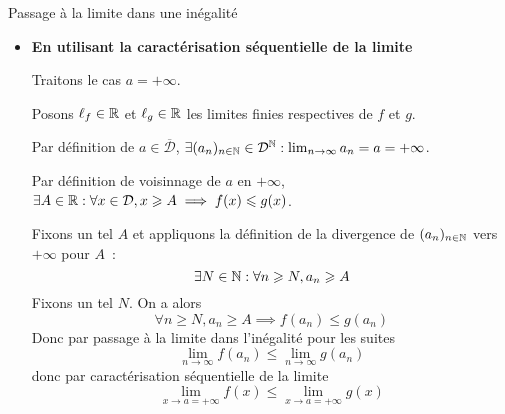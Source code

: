 \documentclass{article}
\renewenvironment{question_kholle}[2][ ]
{
	\subsection{\texorpdfstring{#2}{}}
	\notblank{#1}
	{
		\noindent #1
		\bigbreak
	}
	{}
	\begin{proof}
}
{
	\end{proof}
}
\begin{document}
{Passage à la limite dans une inégalité}
	\hfill\\
	\begin{itemize}[label=$\star$]
		\item \textbf{En utilisant la caractérisation séquentielle de la limite}

		      Traitons le cas $a = +\infty$.

		      Posons $\ell_{f} \in\mathbb R$ et $\ell_{g} \in \mathbb R$ les limites finies respectives de $f$ et $g$.

		      Par définition de $a \in \overline{\mathcal{D}}$, $\exists (a_{n})_{n \in \mathbb N} \in \mathcal{D}^{\mathbb N} : \lim_{ n \to \infty }a_{n} = a = +\infty$.

		      Par définition de voisinnage de $a$ en $+\infty$, $\exists A \in \mathbb R : \forall x \in \mathcal{D}, x\geqslant A \implies f(x) \leqslant g(x)$.

		      Fixons un tel $A$ et appliquons la définition de la divergence de $(a_{n})_{n \in \mathbb N}$ vers $+\infty$ pour $A$~:
		      $$
			      \exists N \in \mathbb N : \forall n \geqslant N, a_{n} \geqslant A
		      $$
		      Fixons un tel $N$. On a alors
		      $$
			      \forall n \geqslant N, a_{n} \geqslant A \implies f(a_{n}) \leqslant g(a_{n})
		      $$
		      Donc par passage à la limite dans l'inégalité pour les suites
		      $$
			      \lim_{ n \to \infty } f(a_{n}) \leqslant \lim_{ n \to \infty } g(a_{n})
		      $$
		      donc par caractérisation séquentielle de la limite
		      $$
			      \lim_{ x \to a=+\infty}  f(x) \leqslant \lim_{ x \to a  = +\infty} g(x)
		      $$


\end{itemize}
\end{question_kholle}
\end{document}
